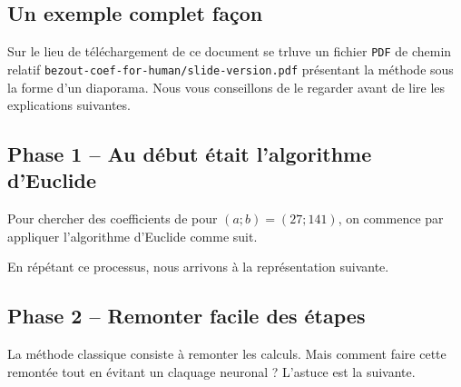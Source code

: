\subsection{Un exemple complet façon }

Sur le lieu de téléchargement de ce document se trluve un fichier \verb+PDF+ de chemin relatif \verb+bezout-coef-for-human/slide-version.pdf+ présentant la méthode sous la forme d'un diaporama. Nous vous conseillons de le regarder avant de lire les explications suivantes.




\subsection{Phase 1 -- Au début était l'algorithme d'Euclide}

Pour chercher des coefficients de \bb{} pour $(a ; b) = (27 ; 141)$, on commence par appliquer l'algorithme d'Euclide  comme suit.

\begin{multicols}{2}

\end{multicols}

\begin{multicols}{2}

\end{multicols}


\medskip


En répétant ce processus, nous arrivons à la représentation suivante.





\subsection{Phase 2 -- Remonter facile des étapes}

La méthode classique consiste à remonter les calculs. Mais comment faire cette remontée tout en évitant un claquage neuronal ? L'astuce est la suivante.

